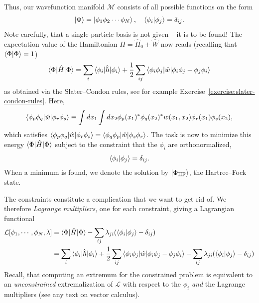 \documentclass{report}
\theoremstyle{plain}
\theoremstyle{definition}
\begin{document}
Thus, our wavefunction manifold $\mathcal{M}$ consists of all possible
functions on the form
\begin{equation}
  \ket{\Phi} = \ket{\phi_1 \phi_2 \cdots \phi_N}, \quad
  \braket{\phi_i|\phi_j}= \delta_{ij}.
\end{equation}
Note carefully, that a single-particle basis is not given -- it is to
be found!
%
The expectation value of the Hamiltonian $\hat{H} = \hat{H}_0 +
\hat{W}$ now reads (recalling
that $\braket{\Phi|\Phi}=1$)
\begin{equation}
  \braket{\Phi|\hat{H}|\Phi} = \sum_i 
  \braket{\phi_i|\hat{h}|\phi_i} + \frac{1}{2}\sum_{ij} \braket{\phi_i
    \phi_j | \hat{w} |\phi_i\phi_j - \phi_j\phi_i}
  \label{eq:hf-energy}
\end{equation}
as obtained via the Slater--Condon rules, see for example
Exercise~\ref{exercise:slater-condon-rules}. Here,
\begin{equation}
  \braket{\phi_p\phi_q|\hat{w}|\phi_r\phi_s} \equiv \int
  dx_1\int dx_2 \phi_p(x_1)^*\phi_q(x_2)^* w(x_1,x_2)
  \phi_r(x_1)\phi_s(x_2),
\end{equation}
which satisfies
$\braket{\phi_p\phi_q|\hat{w}|\phi_r\phi_s}=\braket{\phi_q\phi_p|\hat{w}|\phi_s\phi_r}$. 
The task is now to minimize this energy $\braket{\Phi|\hat{H}|\Phi}$
subject to the constraint that the $\phi_i$ are orthonormalized,
\begin{equation}
  \braket{\phi_i|\phi_j} = \delta_{ij}.
\end{equation}
When a minimum is found, we denote the solution by
$\ket{\Phi_\text{HF}}$, the Hartree--Fock state.

The constraints constitute a complication that we want to get rid
of. We therefore \emph{Lagrange multipliers}, one for each constraint, giving
a Lagrangian functional
\begin{equation}
  \begin{split}
  \mathcal{L}[\phi_1,\cdots,\phi_N, \lambda] &=
  \braket{\Phi|\hat{H}|\Phi} -
  \sum_{ij}\lambda_{ji}(\braket{\phi_i|\phi_j} - \delta_{ij}) \\
  &=\sum_i 
  \braket{\phi_i|\hat{h}|\phi_i} + \frac{1}{2}\sum_{ij} \braket{\phi_i
    \phi_j | \hat{w} |\phi_i\phi_j - \phi_j\phi_i} -
  \sum_{ij}\lambda_{ji}(\braket{\phi_i|\phi_j}-\delta_{ij}) \label{eq:hf-lagrangian}
\end{split}
\end{equation}
Recall, that computing an extremum for the constrained
problem is equivalent to an \emph{unconstrained} extremalization of
$\mathcal{L}$ with respect to the $\phi_i$ \emph{and} the Lagrange
multipliers (see any text on vector calculus). 
\end{document}
